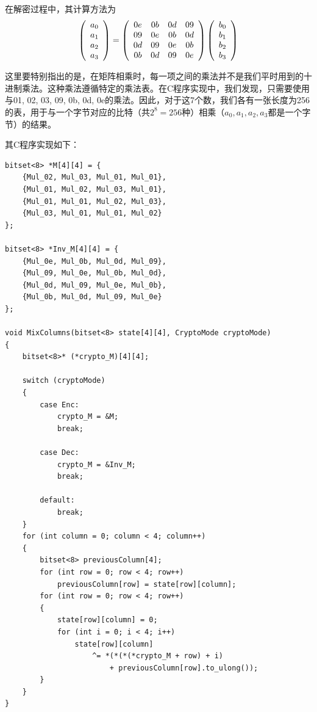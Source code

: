 在解密过程中，其计算方法为
\begin{equation}
\left( {\begin{array}{c}a_0\\a_1\\a_2\\a_3\end{array}}\right)=\left( {\begin{array}{cccc}0e&0b&0d&09\\09&0e&0b&0d\\0d&09&0e&0b\\0b&0d&09&0e\end{array}}\right)\left( {\begin{array}{c}b_0\\b_1\\b_2\\b_3\end{array}}\right)
\end{equation}

这里要特别指出的是，在矩阵相乘时，每一项之间的乘法并不是我们平时用到的十进制乘法。这种乘法遵循特定的乘法表。在C程序实现中，我们发现，只需要使用与01, 02, 03, 09, 0b, 0d, 0e的乘法。因此，对于这7个数，我们各有一张长度为256的表，用于与一个字节对应的比特（共$2^8=256$种）相乘（$a_0, a_1, a_2, a_3$都是一个字节）的结果。\par
其C程序实现如下：
\begin{prove}
\begin{verbatim}
bitset<8> *M[4][4] = {
    {Mul_02, Mul_03, Mul_01, Mul_01},
    {Mul_01, Mul_02, Mul_03, Mul_01},
    {Mul_01, Mul_01, Mul_02, Mul_03},
    {Mul_03, Mul_01, Mul_01, Mul_02}
};

bitset<8> *Inv_M[4][4] = {
    {Mul_0e, Mul_0b, Mul_0d, Mul_09},
    {Mul_09, Mul_0e, Mul_0b, Mul_0d},
    {Mul_0d, Mul_09, Mul_0e, Mul_0b},
    {Mul_0b, Mul_0d, Mul_09, Mul_0e}
};

void MixColumns(bitset<8> state[4][4], CryptoMode cryptoMode)
{
    bitset<8>* (*crypto_M)[4][4];

    switch (cryptoMode)
    {
        case Enc:
            crypto_M = &M;
            break;
            
        case Dec:
            crypto_M = &Inv_M;
            break;
            
        default:
            break;
    }
    for (int column = 0; column < 4; column++)
    {
        bitset<8> previousColumn[4];
        for (int row = 0; row < 4; row++)
            previousColumn[row] = state[row][column];
        for (int row = 0; row < 4; row++)
        {
            state[row][column] = 0;
            for (int i = 0; i < 4; i++)
                state[row][column]
                    ^= *(*(*(*crypto_M + row) + i)
                        + previousColumn[row].to_ulong());
        }
    }
}
\end{verbatim}
\end{prove}
